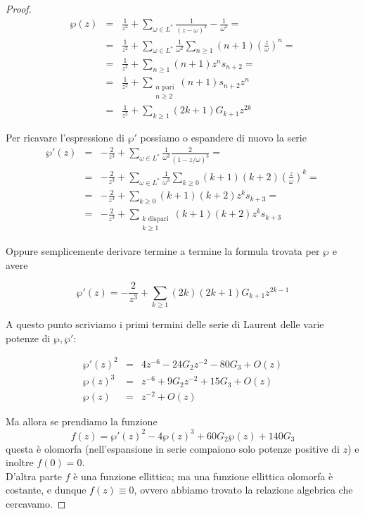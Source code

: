 \begin{proof}
    \begin{eqnarray*}
    \wp(z) & = & \frac{1}{z^2} + \sum_{\omega \in L^*} \frac1{(z-\omega)^2}-\frac1{\omega^2} = \\
           & = & \frac{1}{z^2} + \sum_{\omega \in L^*} \frac{1}{\omega^2} \sum_{n \ge 1} (n+1) \left ( \frac{z}{\omega} \right ) ^n =  \\
           & = & \frac{1}{z^2} + \sum_{n \ge 1} (n+1) z^n s_{n+2} = \\
           & = & \frac{1}{z^2} + \sum_{\substack{n \text{ pari} \\ n \ge 2}} (n+1)s_{n+2} z^n \\
           & = & \frac{1}{z^2} + \sum_{k\ge1} (2k+1)G_{k+1} z^{2k}
    \end{eqnarray*}

    Per ricavare l'espressione di $\wp'$ possiamo o espandere di nuovo la serie
    \begin{eqnarray*}
    \wp'(z)& = & -\frac{2}{z^3}+ \sum_{\omega \in L^*} \frac{1}{\omega^3} \frac{2}{(1-z/\omega)^3}= \\
           & = & -\frac{2}{z^3}+ \sum_{\omega \in L^*} \frac{1}{\omega^3} \sum_{k \ge 0} (k+1)(k+2) \left ( \frac{z}{\omega} \right ) ^k =\\
           & = & -\frac{2}{z^3} + \sum_{k \ge 0} (k+1)(k+2) z^k s_{k+3} =\\
           & = & -\frac{2}{z^3} + \sum_{\substack{k \text{ dispari} \\ k \ge 1}} (k+1)(k+2) z^k s_{k+3}
    \end{eqnarray*}

    Oppure semplicemente derivare termine a termine la formula trovata per $\wp$ e avere

    $$ \wp'(z) = -\frac{2}{z^3}+\sum_{k\ge1}(2k)(2k+1)G_{k+1}z^{2k-1}$$


    A questo punto scriviamo i primi termini delle serie di Laurent delle varie potenze di $\wp,\wp'$:

    \begin{eqnarray*}
    \wp'(z)^2& = & 4z^{-6}-24G_2z^{-2}-80G_3+O(z) \\
    \wp(z)^3 & = & z^{-6}+9G_2z^{-2}+15G_3+O(z)  \\
    \wp(z) & = & z^{-2}+O(z)
    \end{eqnarray*}

    Ma allora se prendiamo la funzione $$ f(z)= \wp'(z)^2 -4\wp(z)^3+60G_2\wp(z)+140G_3 $$
    questa è olomorfa (nell'espansione in serie compaiono solo potenze positive di $z$) e inoltre $f(0)=0$.\\
    D'altra parte $f$ è una funzione ellittica; ma una funzione ellittica olomorfa è costante, e dunque $f(z)\equiv 0$, ovvero abbiamo trovato la relazione algebrica che cercavamo.

\end{proof}
